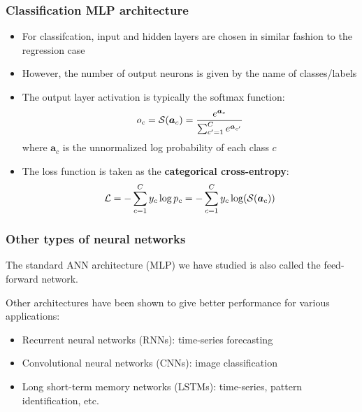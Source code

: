 \documentclass[smaller]{beamer}
\begin{document}
\begin{frame}
  \frametitle{Classification MLP architecture}
  \pause
  \begin{itemize}
  \item For classifcation, input and hidden layers are chosen in similar fashion to the regression case

    \pause

  \item However, the number of output neurons is given by the name of classes/labels

  \item The output layer activation is typically the softmax function:
    \begin{equation}
     o_{c} =  \mathcal{S}(\bm a_{c}) = \frac{e^{\bm a_{c}}}{\sum_{c'=1}^{C}e^{\bm a_{c'}}}
    \end{equation}
    where $\bm a_{c}$ is the unnormalized log probability of each class $c$
    
    \pause
    
  \item The loss function is taken as the \textbf{categorical cross-entropy}:\pe
    \begin{equation}
      \mathcal{L} = -\sum_{c=1}^{C}y_{c}\log p_{c} = - \sum_{c=1}^{C}y_{c}\log(\mathcal{S}(\bm a_{c}) )   \end{equation}
  \end{itemize}
\end{frame}

\begin{frame}
  \frametitle{Other types of neural networks}
  \pause

  The standard ANN architecture (MLP) we have studied is also called the feed-forward network.

  \medskip
  
  Other architectures have been shown to give better performance for various applications: \pause

  \medskip
  \begin{itemize}[<+->]
  \item Recurrent neural networks (RNNs): time-series forecasting

  \item Convolutional neural networks (CNNs): image classification

  \item Long short-term memory networks (LSTMs): time-series, pattern identification, etc.
  \end{itemize}
  \pause
\end{frame}
\end{document}
